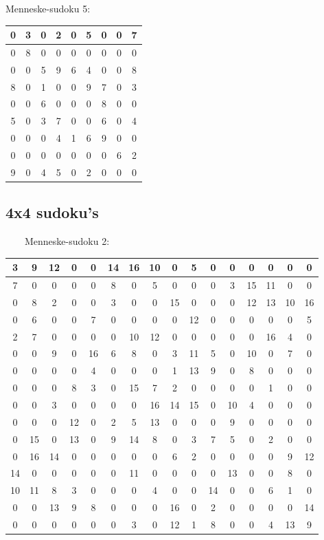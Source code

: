 \documentclass[]{report}
\begin{document}
Menneske-sudoku 5:
\begin{tabular}{|c|c|c||c|c|c||c|c|c|}
\hline
0&3&0&2&0&5&0&0&7\\ \hline
0&8&0&0&0&0&0&0&0\\\hline
0&0&5&9&6&4&0&0&8\\\hline\hline
8&0&1&0&0&9&7&0&3\\\hline
0&0&6&0&0&0&8&0&0\\\hline
5&0&3&7&0&0&6&0&4\\\hline\hline
0&0&0&4&1&6&9&0&0\\\hline
0&0&0&0&0&0&0&6&2\\\hline
9&0&4&5&0&2&0&0&0\\ \hline
\end{tabular}

\subsection{4x4 sudoku's}
\ \ \ \ Menneske-sudoku 2:
\begin{tabular}{|c|c|c|c||c|c|c|c||c|c|c|c||c|c|c|c|}
\hline
3&9&12&0&0&14&16&10&0&5&0&0&0&0&0&0\\\hline
7&0&0&0&0&8&0&5&0&0&0&3&15&11&0&0\\\hline
0&8&2&0&0&3&0&0&15&0&0&0&12&13&10&16\\\hline
0&6&0&0&7&0&0&0&0&12&0&0&0&0&0&5\\\hline\hline
2&7&0&0&0&0&10&12&0&0&0&0&0&16&4&0\\\hline
0&0&9&0&16&6&8&0&3&11&5&0&10&0&7&0\\\hline
0&0&0&0&4&0&0&0&1&13&9&0&8&0&0&0\\\hline
0&0&0&8&3&0&15&7&2&0&0&0&0&1&0&0\\\hline\hline
0&0&3&0&0&0&0&16&14&15&0&10&4&0&0&0\\\hline
0&0&0&12&0&2&5&13&0&0&0&9&0&0&0&0\\\hline
0&15&0&13&0&9&14&8&0&3&7&5&0&2&0&0\\\hline
0&16&14&0&0&0&0&0&6&2&0&0&0&0&9&12\\\hline\hline
14&0&0&0&0&0&11&0&0&0&0&13&0&0&8&0\\\hline
10&11&8&3&0&0&0&4&0&0&14&0&0&6&1&0\\\hline
0&0&13&9&8&0&0&0&16&0&2&0&0&0&0&14\\\hline
0&0&0&0&0&0&3&0&12&1&8&0&0&4&13&9\\\hline
\end{tabular}
\end{document}

